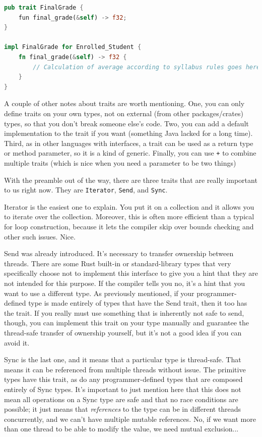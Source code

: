 \documentclass[a4paper]{report}
\begin{document}
\begin{lstlisting}[language=Rust]
pub trait FinalGrade {
	fun final_grade(&self) -> f32;
}

impl FinalGrade for Enrolled_Student {
    fn final_grade(&self) -> f32 {
        // Calculation of average according to syllabus rules goes here
    }	
}  
\end{lstlisting}

A couple of other notes about traits are worth mentioning. One, you can only define traits on your own types, not on external (from other packages/crates) types, so that you don't break someone else's code. Two, you can add a default implementation to the trait if you want (something Java lacked for a long time). Third, as in other languages with interfaces, a trait can be used as a return type or method parameter, so it is a kind of generic. Finally, you can use \texttt{+} to combine multiple traits (which is nice when you need a parameter to be two things)

With the preamble out of the way, there are three traits that are really important to us right now. They are \texttt{Iterator}, \texttt{Send}, and \texttt{Sync}. 

Iterator is the easiest one to explain. You put it on a collection and it allows you to iterate over the collection. Moreover, this is often more efficient than a typical for loop construction, because it lets the compiler skip over bounds checking and other such issues. Nice.

Send was already introduced. It's necessary to transfer ownership between threads. There are some Rust built-in or standard-library types that very specifically choose not to implement this interface to give you a hint that they are not intended for this purpose. If the compiler tells you no, it's a hint that you want to use a different type. As previously mentioned, if your programmer-defined type is made entirely of types that have the Send trait, then it too has the trait. If you really must use something that is inherently not safe to send, though, you can implement this trait on your type manually and guarantee the thread-safe transfer of ownership yourself, but it's not a good idea if you can avoid it.

Sync is the last one, and it means that a particular type is thread-safe. That means it can be referenced from multiple threads without issue. The primitive types have this trait, as do any programmer-defined types that are composed entirely of Sync types. It's important to just mention here that this does not mean all operations on a Sync type are safe and that no race conditions are possible; it just means that \textit{references} to the type can be in different threads concurrently, and we can't have multiple mutable references. No, if we want more than one thread to be able to modify the value, we need mutual exclusion...
\end{document}
